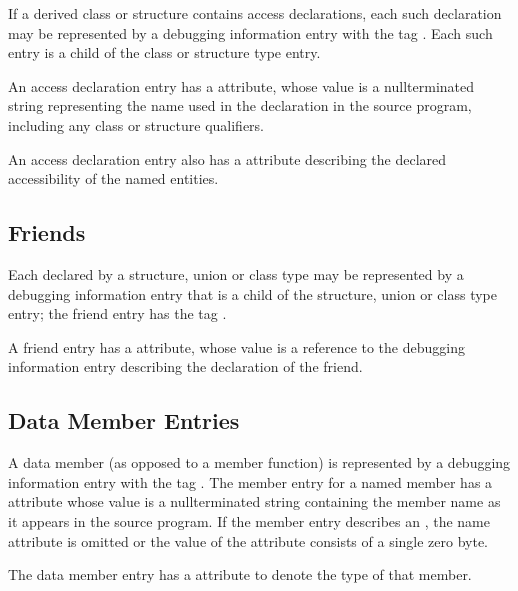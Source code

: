 If a derived class or structure contains access declarations,
each such declaration may be represented by a debugging
information entry with the tag 
\DWTAGaccessdeclarationTARG. 
Each
such entry is a child of the class or structure type entry.

An access declaration entry has 
a \DWATname{} attribute, 
whose
value is a null\dash terminated string representing the name used
in the declaration in the source program, including any class
or structure qualifiers.

An access declaration entry 
\hypertarget{chap:DWATaccessibilitycppbaseclasses}{}
also 
has a 
\DWATaccessibility{}
attribute describing the declared accessibility of the named
entities.


\subsection{Friends}
\label{chap:friends}

Each  
declared by a structure, union or class
\hypertarget{chap:DWATfriendfriendrelationship}{}
type may be represented by a debugging information entry
that is a child of the structure, union or class type entry;
the friend entry has the 
tag \DWTAGfriendTARG.

A friend entry has 
a \DWATfriend{} attribute, whose value is
a reference to the debugging information entry describing
the declaration of the friend.


\subsection{Data Member Entries}
\label{chap:datamemberentries}

A data member (as opposed to a member function) is
represented by a debugging information entry with the 
tag \DWTAGmemberTARG. 
The 
member entry for a named member has
a \DWATname{} attribute 
whose value is a null\dash terminated
string containing the member name as it appears in the source
program. If the member entry describes an 
,
the name attribute is omitted or the value of the attribute
consists of a single zero byte.

The data member entry has 
a 
\DWATtype{} attribute to denote
the type of that member.

